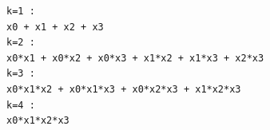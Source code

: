 \begin{verbatim}
k=1 : 
x0 + x1 + x2 + x3
k=2 : 
x0*x1 + x0*x2 + x0*x3 + x1*x2 + x1*x3 + x2*x3
k=3 : 
x0*x1*x2 + x0*x1*x3 + x0*x2*x3 + x1*x2*x3
k=4 : 
x0*x1*x2*x3
\end{verbatim}
